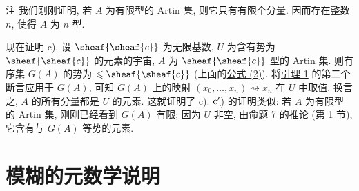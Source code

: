 \begin{enonce*}[remark]{注}
我们刚刚证明, 若 $A$ 为有限型的 Artin 集, 则它只有有限个分量. 因而存在整数 $n$, 使得 $A$ 为 $n$ 型.
\end{enonce*}
现在证明 c). 设 $\sheaf{\sheaf{c}}$ 为无限基数, $U$ 为含有势为 $\sheaf{\sheaf{c}}$ 的元素的宇宙, $A$ 为 $\sheaf{\sheaf{c}}$ 型的 Artin 集. 则有序集 $G(A)$ 的势为 $\leq\sheaf{\sheaf{c}}$ (上面的\hyperlink{sga4.exp.I.appendix.II.sec.6.theorem.2.proof.equation.2}{公式 (2)}). 将\hyperlink{sga4.exp.I.appendix.II.sec.6.lemma.1}{引理 1} 的第二个断言应用于 $G(A)$, 可知 $G(A)$ 上的映射 $(x_0,\ldots,x_n)\rightsquigarrow x_n$ 在 $U$ 中取值. 换言之, $A$ 的所有分量都是 $U$ 的元素. 这就证明了 c). \hyperlink{sga4.exp.I.appendix.II.sec.6.theorem.2.part.c-prime}{${\rm c'}$)} 的证明类似: 若 $A$ 为有限型的 Artin 集, 刚刚已经看到 $G(A)$ 有限; 因为 $U$ 非空, 由\hyperlink{sga4.exp.I.appendix.II.sec.1.corollary.to.proposition.7}{命题 7 的推论} (\hyperlink{sga4.exp.I.appendix.II.sec.1}{第 1 节}), 它含有与 $G(A)$ 等势的元素. \cqfd




\section{模糊的元数学说明}%
\hypertarget{sga4.exp.I.appendix.II.sec.7}{}\pageoriginale

